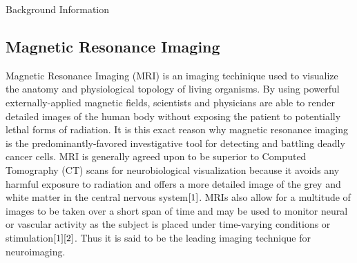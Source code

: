 \documentclass[a4paper,12pt]{article}
\begin{document}
\newpage
\doublespacing


\begin{section}{Background Information}








\subsection{Magnetic Resonance Imaging}
Magnetic Resonance Imaging (MRI) is an imaging techinique used to visualize the anatomy and physiological topology of living organisms. By using powerful externally-applied magnetic fields, scientists and physicians are able to render detailed images of the human body without exposing the patient to potentially lethal forms of radiation. It is this exact reason why magnetic resonance imaging is the predominantly-favored investigative tool for detecting and battling deadly cancer cells. MRI is generally agreed upon to be superior to Computed Tomography (CT) scans for neurobiological visualization because it avoids any harmful exposure to radiation and offers a more detailed image of the grey and white matter in the central nervous system$\cite{1}$.
MRIs also allow for a multitude of images to be taken over a short span of time and may be used to monitor neural or vascular activity as the subject is placed under time-varying conditions or stimulation$\cite{1}\cite{2}$.
Thus it is said to be the leading imaging technique for neuroimaging. \


\end{section}
\end{document}

